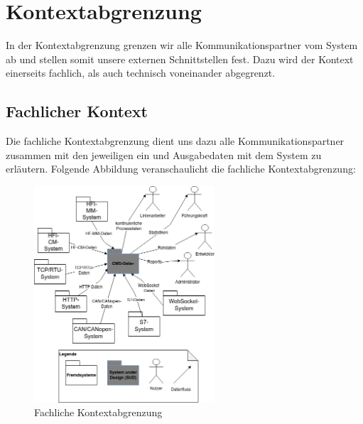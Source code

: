 \chapter{Kontextabgrenzung}
\label{ch:Kontextabgrenzung}
In der Kontextabgrenzung grenzen wir alle Kommunikationspartner vom System ab und stellen somit unsere externen Schnittstellen fest. Dazu wird der Kontext einerseits fachlich, als auch technisch voneinander abgegrenzt.
\section{Fachlicher Kontext}
Die fachliche Kontextabgrenzung dient uns dazu alle Kommunikationspartner zusammen mit den jeweiligen ein und Ausgabedaten mit dem System zu erläutern. Folgende Abbildung veranschaulicht die fachliche Kontextabgrenzung:
\begin{figure}[h]
	\centering
	\includegraphics[width=0.6\textwidth]{Graphics/fachliche_kontextabgrenzung.png}
	\caption{Fachliche Kontextabgrenzung}
	\label{fig:fachliche_kontextabgrenzung}
\end{figure}

